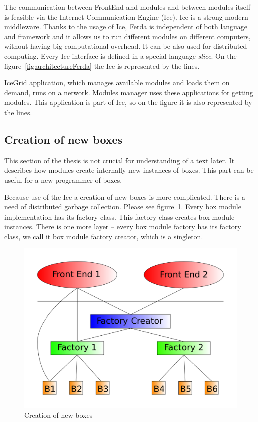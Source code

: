 \documentclass[a4paper,12pt]{book}
\begin{document}
The communication between FrontEnd and modules and between modules itself is feasible via the Internet Communication Engine (Ice). Ice is a strong modern middleware. Thanks to the usage of Ice, Ferda is independent of both language and framework and it allows us to run different modules on different computers, without having big computational overhead. It can be also used for distributed computing. Every Ice interface is defined in a special language \emph{slice}. On the figure~\ref{fig:architectureFerda} the Ice is represented by the lines.

IceGrid application, which manages available modules and loads them on demand, runs on a network. Modules manager uses these applications for getting modules. This application is part of Ice, so on the figure it is also represented by the lines.

\subsection{Creation of new boxes}
This section of the thesis is not crucial for understanding of a text later. It describes how modules create internally new instances of boxes. This part can be useful for a new programmer of boxes.  

Because use of the Ice a creation of new boxes is more complicated. There is a need of distributed garbage collection. Please see figure~\ref{fig:creatorFactory}. Every box module implementation has its factory class. This factory class creates box module instances. There is one more layer -- every box module factory has its factory class, we call it box module factory creator, which is a singleton.

\begin{figure}
	\noindent\includegraphics[width=1\textwidth]{creatorFactory}
	\caption{Creation of new boxes}
	\label{fig:creatorFactory}
\end{figure}
\end{document}
